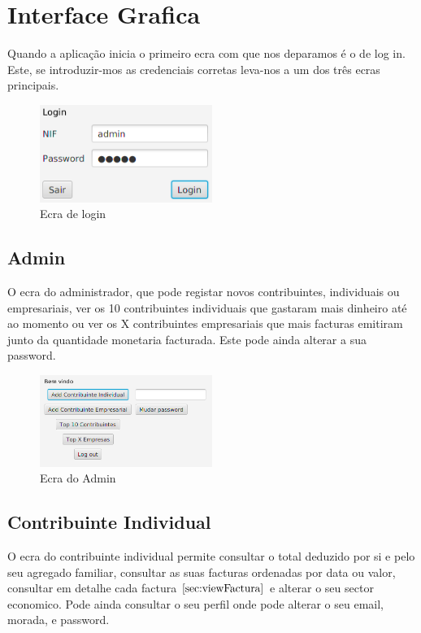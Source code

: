 \documentclass[12pt,a4paper]{report}
\begin{document}
\chapter{Interface Grafica}

    Quando a aplicação inicia o primeiro ecra com que nos deparamos é o de log
    in. Este, se introduzir-mos as credenciais corretas leva-nos a um dos três
    ecras principais.
\begin{figure}[h]
    \centering
    \includegraphics[width=0.5\textwidth]{./images/login.png}
    \caption{Ecra de login}
    \label{fig:login}
\end{figure}

    \section{Admin} %
    O ecra do administrador, que pode registar novos contribuintes, individuais
    ou empresariais, ver os 10 contribuintes individuais que gastaram mais
    dinheiro até ao momento ou ver os X contribuintes empresariais que mais
    facturas emitiram junto da quantidade monetaria facturada.
    Este pode ainda alterar a sua password.
\begin{figure}[h]
    \centering
    \includegraphics[width=0.5\textwidth]{./images/AdminScreen.png}
    \caption{Ecra do Admin}
    \label{fig:admin}
\end{figure}

\pagebreak

    \section{Contribuinte Individual}
    O ecra do contribuinte individual permite consultar o total deduzido por
    si e pelo seu agregado familiar, consultar as suas facturas ordenadas por
    data ou valor, consultar em detalhe cada factura \(\ref{sec:viewFactura}\)
    e alterar o seu sector economico. Pode ainda consultar o seu perfil onde
    pode alterar o seu email, morada, e password.
\end{document}
